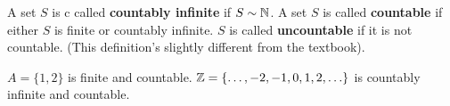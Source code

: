 \begin{theorem}
	A set  $S$ is c called \textbf{countably infinite} if $S \sim \mathbb{N}$. A set $S$ is called \textbf{countable} if either $S$ is finite or countably infinite. $S$ is called \textbf{uncountable} if it is not countable. (This definition's slightly different from the textbook).
\end{theorem}

\begin{eg}
	$A = \{1, 2\}$ is finite and countable. $\mathbb{Z} = \{\ldots, -2, -1, 0, 1, 2, \ldots\}$ is countably infinite and countable.
\end{eg}



